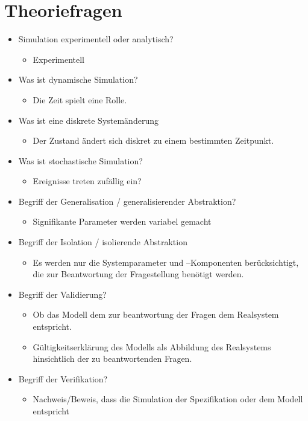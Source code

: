 \section{Theoriefragen}
\begin{itemize}
    \item Simulation experimentell oder analytisch?
    \begin{itemize}
        \item Experimentell
    \end{itemize}
    \item Was ist dynamische Simulation?
    \begin{itemize}
        \item Die Zeit spielt eine Rolle.
    \end{itemize}
    \item Was ist eine diskrete Systemänderung
    \begin{itemize}
        \item Der Zustand ändert sich diskret zu einem bestimmten Zeitpunkt.
    \end{itemize}
    \item Was ist stochastische Simulation?
    \begin{itemize}
        \item Ereignisse treten zufällig ein?
    \end{itemize}
    \item Begriff der Generalisation / generalisierender Abstraktion?
    \begin{itemize}
        \item Signifikante Parameter werden variabel gemacht
    \end{itemize}
    \item Begriff der Isolation / isolierende Abstraktion
    \begin{itemize}
        \item Es werden nur die Systemparameter und –Komponenten berücksichtigt, die zur Beantwortung der Fragestellung benötigt werden.
    \end{itemize}
    \item Begriff der Validierung?
    \begin{itemize}
        \item  Ob das Modell dem zur beantwortung der Fragen dem Realsystem entspricht.
        \item Gültigkeitserklärung des Modells als Abbildung des Realsystems hinsichtlich der zu beantwortenden Fragen.
    \end{itemize}
    \item Begriff der Verifikation?
    \begin{itemize}
        \item Nachweis/Beweis, dass die Simulation der Spezifikation oder dem Modell entspricht


\end{itemize}
\end{itemize}
